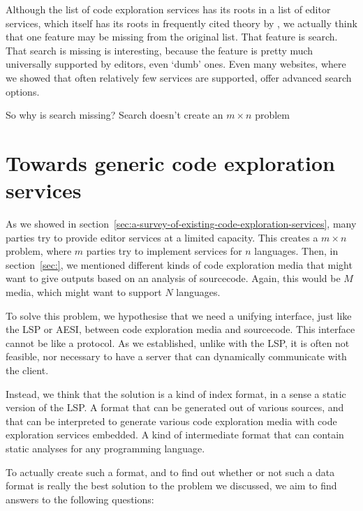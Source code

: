 Although the list of code exploration services has its roots in a list of editor services, which itself has its roots in
frequently cited theory by \textcite{ErdwegSV13}, we actually think that one feature may be missing from the original list.
That feature is search.
That search is missing is interesting, because the feature is pretty much universally supported by editors, even `dumb' ones.
Even many websites, where we showed that often relatively few services are supported, offer advanced search options.

So why is search missing?
Search doesn't create an $m \times n$ problem

\section{Towards generic code exploration services}

As we showed in section~\ref{sec:a-survey-of-existing-code-exploration-services}, many parties try to provide editor services
at a limited capacity.
This creates a $m \times n$ problem, where $m$ parties try to implement services for $n$ languages.
Then, in section~\ref{sec:}, we mentioned different kinds of code exploration media that might
want to give outputs based on an analysis of sourcecode.
Again, this would be $M$ media, which might want to support $N$ languages.

To solve this problem, we hypothesise that we need a unifying interface, just like the \ac{LSP} or \ac{AESI}, between code exploration media
and sourcecode.
This interface cannot be like a protocol.
As we established, unlike with the \ac{LSP}, it is often not feasible, nor necessary to have a server that can
dynamically communicate with the client.

Instead, we think that the solution is a kind of index format, in a sense a static version of the \ac{LSP}.
A format that can be generated out of various sources, and that can be interpreted to generate various code exploration media
with code exploration services embedded.
A kind of intermediate format that can contain static analyses for any programming language.

To actually create such a format, and to find out whether or not such a data format is really the best solution to the problem we discussed,
we aim to find answers to the following questions:


